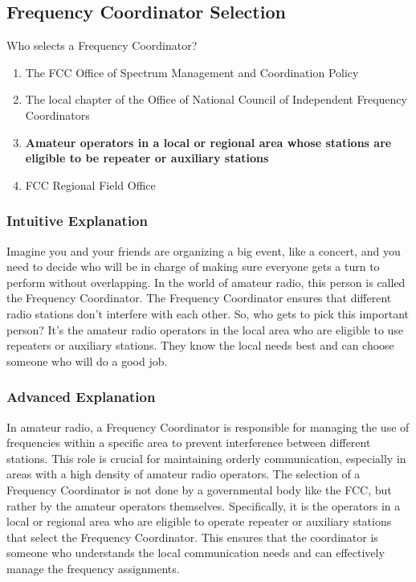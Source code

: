 \subsection{Frequency Coordinator Selection}
\label{T1A09}

\begin{tcolorbox}[colback=gray!10!white,colframe=black!75!black,title=T1A09]
Who selects a Frequency Coordinator?
\begin{enumerate}[label=\Alph*,noitemsep]
    \item The FCC Office of Spectrum Management and Coordination Policy
    \item The local chapter of the Office of National Council of Independent Frequency Coordinators
    \item \textbf{Amateur operators in a local or regional area whose stations are eligible to be repeater or auxiliary stations}
    \item FCC Regional Field Office
\end{enumerate}
\end{tcolorbox}

\subsubsection*{Intuitive Explanation}
Imagine you and your friends are organizing a big event, like a concert, and you need to decide who will be in charge of making sure everyone gets a turn to perform without overlapping. In the world of amateur radio, this person is called the Frequency Coordinator. The Frequency Coordinator ensures that different radio stations don't interfere with each other. So, who gets to pick this important person? It's the amateur radio operators in the local area who are eligible to use repeaters or auxiliary stations. They know the local needs best and can choose someone who will do a good job.

\subsubsection*{Advanced Explanation}
In amateur radio, a Frequency Coordinator is responsible for managing the use of frequencies within a specific area to prevent interference between different stations. This role is crucial for maintaining orderly communication, especially in areas with a high density of amateur radio operators. The selection of a Frequency Coordinator is not done by a governmental body like the FCC, but rather by the amateur operators themselves. Specifically, it is the operators in a local or regional area who are eligible to operate repeater or auxiliary stations that select the Frequency Coordinator. This ensures that the coordinator is someone who understands the local communication needs and can effectively manage the frequency assignments.